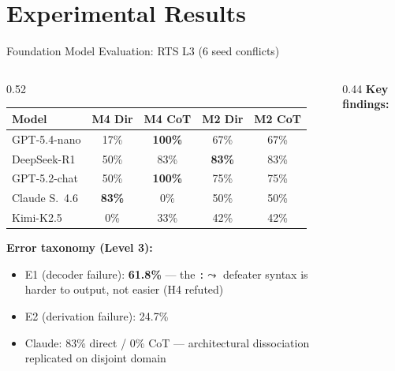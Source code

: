 \documentclass[aspectratio=169, 10pt]{beamer}
\begin{document}
\section{Experimental Results}

\begin{frame}{Foundation Model Evaluation: RTS L3 (6 seed conflicts)}

  \begin{columns}[T]
    \begin{column}{0.52\textwidth}
      \vspace{0.2em}
      \begin{center}
      \small
      \begin{tabular}{@{}lcccc@{}}
        \toprule
        Model & M4 Dir & M4 CoT & M2 Dir & M2 CoT \\
        \midrule
        GPT-5.4-nano    & 17\% & \textbf{100\%} & 67\% & 67\% \\
        DeepSeek-R1     & 50\% & 83\%           & \textbf{83\%} & 83\% \\
        GPT-5.2-chat    & 50\% & \textbf{100\%} & 75\% & 75\% \\
        Claude S.\ 4.6  & \textbf{83\%} & \alert{0\%} & 50\% & 50\% \\
        Kimi-K2.5       & 0\%  & 33\%           & 42\% & 42\% \\
        \bottomrule
      \end{tabular}
      \end{center}

      \vspace{0.5em}
      \textbf{Error taxonomy (Level 3):}
      \begin{itemize}[leftmargin=1em, itemsep=2pt]
        \item E1 (decoder failure): \textbf{61.8\%} --- the
              \texttt{:$\leadsto$} defeater syntax is harder to output,
              not easier (H4 refuted)
        \item E2 (derivation failure): 24.7\%
        \item Claude: 83\% direct / \alert{0\% CoT} --- architectural dissociation
              replicated on disjoint domain
      \end{itemize}
    \end{column}

    \begin{column}{0.44\textwidth}
      \textbf{Key findings:}
      \vspace{0.3em}


\end{column}
\end{columns}
\end{frame}
\end{document}
